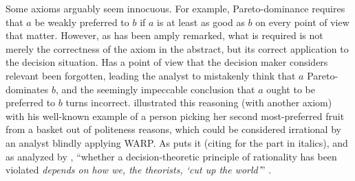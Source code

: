 \documentclass[version=last, pagesize, twoside=off, bibliography=totoc, DIV=calc, fontsize=12pt, a4paper, french, english]{scrartcl}
\begin{document}
Some axioms arguably seem innocuous. For example, Pareto-dominance requires that $a$ be weakly preferred to $b$ if $a$ is at least as good as $b$ on every point of view that matter. However, as has been amply remarked, what is required is not merely the correctness of the axiom in the abstract, but its correct application to the decision situation. Has a point of view that the decision maker considers relevant been forgotten, leading the analyst to mistakenly think that $a$ Pareto-dominates $b$, and the seemingly impeccable conclusion that $a$ ought to be preferred to $b$ turns incorrect. \citet{sen_maximisation_1997} illustrated this reasoning (with another axiom) with his well-known example of a person picking her second most-preferred fruit from a basket out of politeness reasons, which could be considered irrational by an analyst blindly applying WARP. As \citet[p.\ 40]{lecouteux_reconciling_2015} puts it (citing \citet[p.\ 13]{bacharach_beyond_2006} for the part in italics), and as analyzed by \citet{sen_information_1986, sen_internal_1993}, “whether a decision-theoretic principle of rationality has been violated \emph{depends on how we, the theorists, ‘cut up the world’}” .
\end{document}
